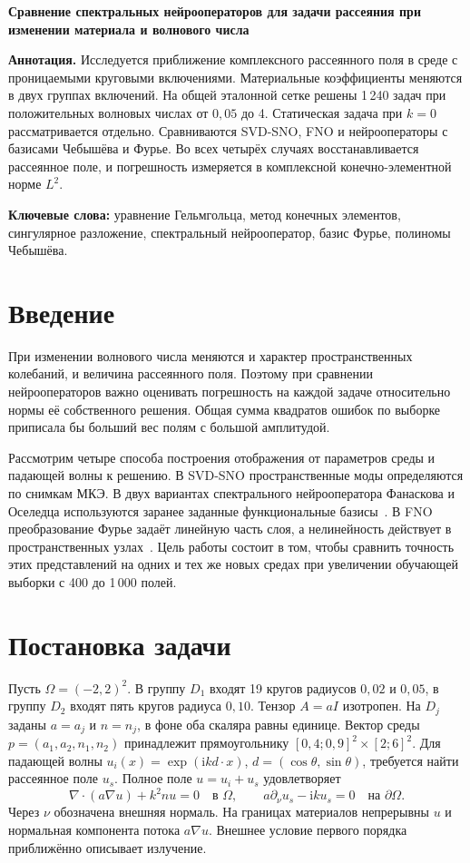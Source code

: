 \documentclass[11pt,a4paper]{article}
\newcommand{\ii}{\mathrm{i}}
\begin{document}
\begin{center}{\Large\bfseries Сравнение спектральных нейрооператоров для задачи рассеяния при изменении материала и волнового числа\par}\end{center}
\noindent\textbf{Аннотация.}
Исследуется приближение комплексного рассеянного поля в среде с проницаемыми круговыми включениями. Материальные коэффициенты меняются в двух группах включений. На общей эталонной сетке решены 1\,240 задач при положительных волновых числах от $0{,}05$ до 4. Статическая задача при $k=0$ рассматривается отдельно. Сравниваются SVD-SNO, FNO и нейрооператоры с базисами Чебышёва и Фурье. Во всех четырёх случаях восстанавливается рассеянное поле, и погрешность измеряется в комплексной конечно-элементной норме $L^2$. 

\smallskip\noindent\textbf{Ключевые слова:} уравнение Гельмгольца, метод конечных элементов, сингулярное разложение, спектральный нейрооператор, базис Фурье, полиномы Чебышёва.

\section*{Введение}
При изменении волнового числа меняются и характер пространственных колебаний, и величина рассеянного поля. Поэтому при сравнении нейрооператоров важно оценивать погрешность на каждой задаче относительно нормы её собственного решения. Общая сумма квадратов ошибок по выборке приписала бы больший вес полям с большой амплитудой.

Рассмотрим четыре способа построения отображения от параметров среды и падающей волны к решению. В SVD-SNO пространственные моды определяются по снимкам МКЭ. В двух вариантах спектрального нейрооператора Фанаскова и Оселедца используются заранее заданные функциональные базисы~\cite{fo}. В FNO преобразование Фурье задаёт линейную часть слоя, а нелинейность действует в пространственных узлах~\cite{li}. Цель работы состоит в том, чтобы сравнить точность этих представлений на одних и тех же новых средах при увеличении обучающей выборки с 400 до 1\,000 полей.

\section{Постановка задачи}
Пусть $\Omega=(-2,2)^2$. В группу $D_1$ входят 19 кругов радиусов $0{,}02$ и $0{,}05$, в группу $D_2$ входят пять кругов радиуса $0{,}10$. Тензор $A=aI$ изотропен. На $D_j$ заданы $a=a_j$ и $n=n_j$, в фоне оба скаляра равны единице. Вектор среды $p=(a_1,a_2,n_1,n_2)$ принадлежит прямоугольнику $[0{,}4;0{,}9]^2\times[2;6]^2$. Для падающей волны $u_i(x)=\exp(\ii k d\cdot x)$, $d=(\cos\theta,\sin\theta)$, требуется найти рассеянное поле $u_s$. Полное поле $u=u_i+u_s$ удовлетворяет
\begin{equation}
 \nabla\!\cdot(a\nabla u)+k^2nu=0\quad\text{в }\Omega,\qquad
 a\partial_\nu u_s-\ii ku_s=0\quad\text{на }\partial\Omega .
 \label{eq:wave}
\end{equation}
Через $\nu$ обозначена внешняя нормаль. На границах материалов непрерывны $u$ и нормальная компонента потока $a\nabla u$. Внешнее условие первого порядка приближённо описывает излучение.
\end{document}
